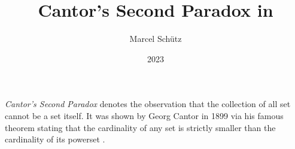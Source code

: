 \documentclass{stex}
\title{Cantor's Second Paradox in \Naproche}
\author{Marcel Schütz}
\date{2023}
\begin{document}
\maketitle

\noindent \emph{Cantor's Second Paradox} denotes the observation that the collection of all set cannot be a set itself.
It was shown by Georg Cantor in 1899 via his famous theorem stating that the cardinality of any set is strictly smaller than the cardinality of its powerset \cite[chapter 163]{Cantor1991}.


\printbibliography
\end{document}
